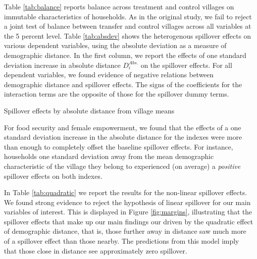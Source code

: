 \documentclass[11pt]{article}
\begin{document}
    Table \ref{tab:balance} reports balance across treatment and control villages on immutable characteristics of households. As in the original study, we fail to reject a joint test of balance between transfer and control villages across all variables at the 5 percent level. Table \ref{tab:absdev} shows the heterogenous spillover effects on various dependent variables, using the absolute deviation as a measure of demographic distance. In the first column, we report the effects of one standard deviation increase in absolute distance  $D_i^{Abs.}$ on the spillover effects. For all dependent variables, we found evidence of negative relations between demographic distance and spillover effects. The signs of the coefficients for the interaction terms are the opposite of those for the spillover dummy terms. \\

    \begin{table}[H]
    \centering
    \caption{Spillover effects by absolute distance from village means}
    \label{tab:absdev}
    \end{table}

    For food security and female empowerment, we found that the effects of a one standard deviation increase in the absolute distance  for the indexes were more than enough to completely offset the baseline spillover effects. For instance, households one standard deviation away from the mean demographic characteristic of the village they belong to experienced (on average) a \textit{positive} spillover effects on both indexes.  

    In Table \ref{tab:quadratic} we report the results for the non-linear spillover effects.
    We found strong evidence to reject the hypothesis of linear spillover for our main variables of interest. 
    This is displayed in Figure \ref{fig:margins}, illustrating that the spillover effects that make up our main findings our driven by the quadratic effect of demographic distance, that is, those further away in distance saw much more of a spillover effect than those nearby. 
    The predictions from this model imply that those close in distance see approximately zero spillover.  
    
\end{document}
